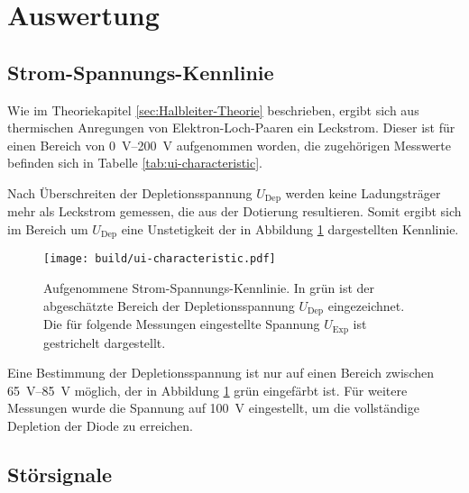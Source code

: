 \newpage
\section{Auswertung}
\label{sec:Auswertung}

\subsection{Strom-Spannungs-Kennlinie}
\label{sec:UI-Auswerung}

Wie im Theoriekapitel \ref{sec:Halbleiter-Theorie}
beschrieben, ergibt sich aus thermischen Anregungen von Elektron-Loch-Paaren
ein Leckstrom.
Dieser ist für einen Bereich von \SIrange{0}{200}{\volt} aufgenommen worden,
die zugehörigen Messwerte befinden sich in Tabelle \ref{tab:ui-characteristic}.

Nach Überschreiten der Depletionsspannung $U_\text{Dep}$ werden keine Ladungsträger mehr als
Leckstrom gemessen, die aus der Dotierung resultieren.
Somit ergibt sich im Bereich um $U_\text{Dep}$ eine Unstetigkeit der in
Abbildung \ref{fig:ui-characteristic} dargestellten Kennlinie.
\begin{figure}
  \centering
  \texttt{[image: build/ui-characteristic.pdf]}  %
  \caption{Aufgenommene Strom-Spannungs-Kennlinie.
  In grün ist der abgeschätzte Bereich der Depletionsspannung $U_\text{Dep}$ eingezeichnet.
  Die für folgende Messungen eingestellte Spannung $U_\text{Exp}$ ist gestrichelt dargestellt.}
  \label{fig:ui-characteristic}
\end{figure}
Eine Bestimmung der Depletionsspannung ist nur auf einen Bereich zwischen
\SIrange[range-phrase={\text{ und }}]{65}{85}{\volt}
möglich, der in Abbildung \ref{fig:ui-characteristic} grün eingefärbt ist.
Für weitere Messungen wurde die Spannung auf \SI{100}{\volt} eingestellt, um
die vollständige Depletion der Diode zu erreichen.

\FloatBarrier
\subsection{Störsignale}
\label{sec:Stoersignale-Auswertung}

